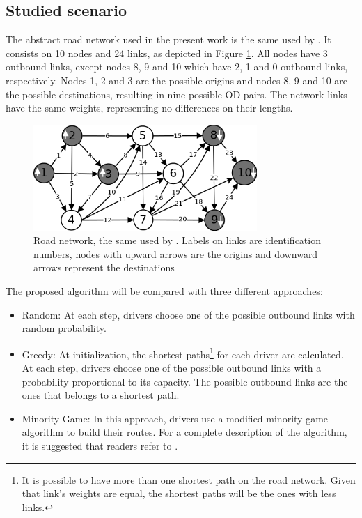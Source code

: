 \documentclass[12pt]{llncs}
\begin{document}
\subsection{Studied scenario}

The abstract road network used in the present work is the same used by \cite{Galib&Moser2011}. It consists on 10 nodes and 24 links, as depicted in Figure \ref{fig:roadnetwork}. All nodes have 3 outbound links, except nodes 8, 9 and 10 which have 2, 1 and 0 outbound links, respectively. Nodes 1, 2 and 3 are the possible origins and nodes 8, 9 and 10 are the possible destinations, resulting in nine possible OD pairs. The network links have the same weights, representing no differences on their lengths.

\begin{figure}[ht]
    \centerline{\includegraphics[width=8.5cm]{img/roadnetwork.png}}
    \caption{Road network, the same used by \cite{Galib&Moser2011}. Labels on links are identification numbers, nodes with upward arrows are the origins and downward arrows represent the destinations}
    \label{fig:roadnetwork}
\end{figure}

The proposed algorithm will be compared with three different approaches:

\begin{itemize}
  \item Random: At each step, drivers choose one of the possible outbound links with random probability.
  \item Greedy: At initialization, the shortest paths\footnote{It is possible to have more than one shortest path on the road network. Given that link's weights are equal, the shortest paths will be the ones with less links.} for each driver are calculated. At each step, drivers choose one of the possible outbound links with a probability proportional to its capacity. The possible outbound links are the ones that belongs to a shortest path. %
  \item Minority Game: In this approach, drivers use a modified minority game algorithm to build their routes. For a complete description of the algorithm, it is suggested that readers refer to \cite{Galib&Moser2011}.
\end{itemize}
\end{document}
